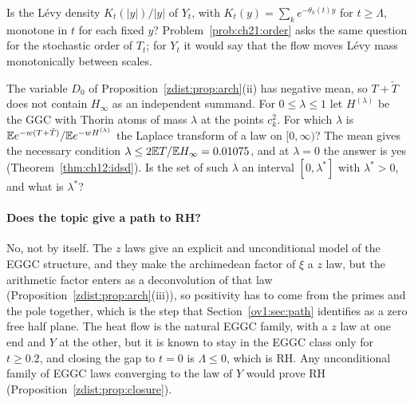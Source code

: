 \begin{problem}\label{zdist:prob:flow}
Is the L\'evy density $K_t(|y|)/|y|$ of $Y_t$, with $K_t(y)=\sum_ke^{-\theta_k(t)y}$ for $t\ge\Lambda$, monotone in $t$ for each fixed $y$? Problem~\ref{prob:ch21:order} asks the same question for the stochastic order of $T_t$; for $Y_t$ it would say that the flow moves L\'evy mass monotonically between scales.
\end{problem}

\begin{problem}\label{zdist:prob:remainder}
The variable $D_0$ of Proposition~\ref{zdist:prop:arch}(ii) has negative mean, so $T+\tilde T$ does not contain $H_\infty$ as an independent summand. For $0\le\lambda\le1$ let $H^{(\lambda)}$ be the GGC with Thorin atoms of mass $\lambda$ at the points $c_k^2$. For which $\lambda$ is $\mathbb{E} e^{-w(T+\tilde T)}/\mathbb{E} e^{-wH^{(\lambda)}}$ the Laplace transform of a law on $[0,\infty)$? The mean gives the necessary condition $\lambda\le2\mathbb{E} T/\mathbb{E} H_\infty=0.01075$, and at $\lambda=0$ the answer is yes (Theorem~\ref{thm:ch12:idsd}). Is the set of such $\lambda$ an interval $[0,\lambda^*]$ with $\lambda^*>0$, and what is $\lambda^*$?
\end{problem}

\paragraph{Does the topic give a path to RH?} No, not by itself. The $z$ laws give an explicit and unconditional model of the EGGC structure, and they make the archimedean factor of $\xi$ a $z$ law, but the arithmetic factor enters as a deconvolution of that law (Proposition~\ref{zdist:prop:arch}(iii)), so positivity has to come from the primes and the pole together, which is the step that Section~\ref{ov1:sec:path} identifies as a zero free half plane. The heat flow is the natural EGGC family, with a $z$ law at one end and $Y$ at the other, but it is known to stay in the EGGC class only for $t\ge0.2$, and closing the gap to $t=0$ is $\Lambda\le0$, which is RH. Any unconditional family of EGGC laws converging to the law of $Y$ would prove RH (Proposition~\ref{zdist:prop:closure}).
